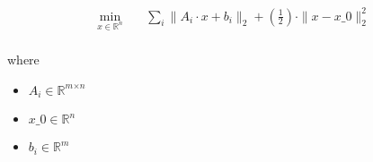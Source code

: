\documentclass[12pt]{article}
\begin{document}
\[
\begin{aligned} \min_{\textit{x} \in \mathbb{R}^{ \textit{n}}} \quad & \sum_\textit{i} \|\textit{A}_{ \textit{i} } \cdot \textit{x} + \textit{b}_{ \textit{i} }\|_2 + (\frac{1}{2}) \cdot \|\textit{x} - \textit{x\_0}\|_2^{2} \\
\end{aligned}
\]

where
\begin{itemize}
\item $\textit{A}_{\textit{i}} \in \mathbb{R}^{ \textit{m} \times \textit{n} }$
\item $\textit{x\_0} \in \mathbb{R}^{ \textit{n}}$
\item $\textit{b}_{\textit{i}} \in \mathbb{R}^{ \textit{m}}$
\end{itemize}
\end{document}
